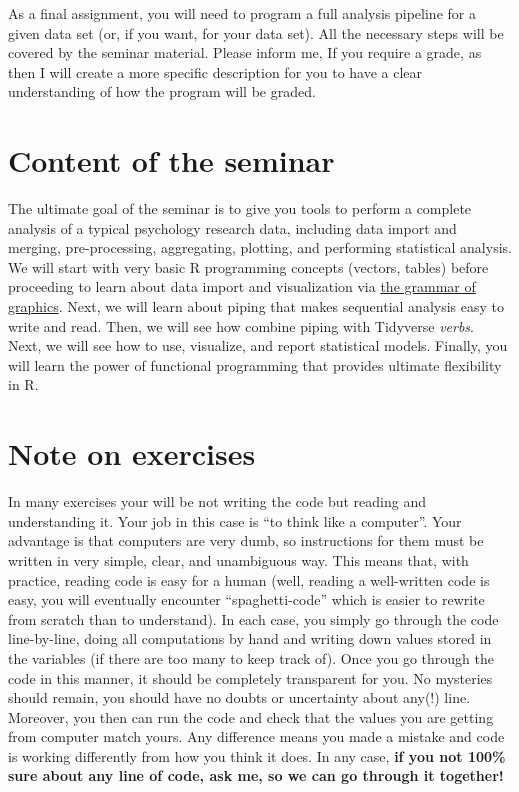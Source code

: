\documentclass[
]{book}
\begin{document}
As a final assignment, you will need to program a full analysis pipeline for a given data set (or, if you want, for your data set). All the necessary steps will be covered by the seminar material. Please inform me, If you require a grade, as then I will create a more specific description for you to have a clear understanding of how the program will be graded.

\hypertarget{content-of-the-seminar}{%
\section*{Content of the seminar}\label{content-of-the-seminar}}

The ultimate goal of the seminar is to give you tools to perform a complete analysis of a typical psychology research data, including data import and merging, pre-processing, aggregating, plotting, and performing statistical analysis. We will start with very basic R programming concepts (vectors, tables) before proceeding to learn about data import and visualization via \href{https://ggplot2.tidyverse.org/}{the grammar of graphics}. Next, we will learn about piping that makes sequential analysis easy to write and read. Then, we will see how combine piping with Tidyverse \emph{verbs}. Next, we will see how to use, visualize, and report statistical models. Finally, you will learn the power of functional programming that provides ultimate flexibility in R.

\hypertarget{note-on-exercises}{%
\section*{Note on exercises}\label{note-on-exercises}}

In many exercises your will be not writing the code but reading and understanding it. Your job in this case is ``to think like a computer''. Your advantage is that computers are very dumb, so instructions for them must be written in very simple, clear, and unambiguous way. This means that, with practice, reading code is easy for a human (well, reading a well-written code is easy, you will eventually encounter ``spaghetti-code'' which is easier to rewrite from scratch than to understand). In each case, you simply go through the code line-by-line, doing all computations by hand and writing down values stored in the variables (if there are too many to keep track of). Once you go through the code in this manner, it should be completely transparent for you. No mysteries should remain, you should have no doubts or uncertainty about any(!) line. Moreover, you then can run the code and check that the values you are getting from computer match yours. Any difference means you made a mistake and code is working differently from how you think it does. In any case, \textbf{if you not 100\% sure about any line of code, ask me, so we can go through it together!}
\end{document}
